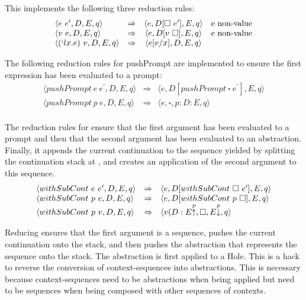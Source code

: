 This implements the following three reduction rules:
\[
\begin{array}{lrcl}
  \langle e\ e^\prime, D, E, q \rangle &\Rightarrow &\langle e, D[\square\ e^\prime], E, q \rangle &\text{e non-value} \\
  \langle v\ e, D, E, q \rangle &\Rightarrow &\langle e, D[v\ \square], E, q \rangle &\text{e non-value} \\
  \langle (`lx.e)\ v, D, E, q \rangle &\Rightarrow &\langle e[v/x], D, E, q \rangle
\end{array}
\]

The following reduction rules for pushPrompt are implemented to ensure the first expression has been evaluated to a prompt:
\[
  \begin{array}{lcl}
    \langle pushPrompt\ e\ e^\prime, D, E, q \rangle &\Rightarrow &\langle e, D[pushPrompt\ \square\ e^\prime], E, q \rangle \\
    \langle pushPrompt\ p\ e, D, E, q \rangle &\Rightarrow &\langle e, \square, p : D : E, q \rangle \\
  \end{array}
\]

The reduction rules for  ensure that the first argument has been evaluated to a prompt  and then that the second argument has been evaluated to an abstraction. Finally, it appends the current continuation to the sequence yielded by splitting the continuation stack at , and creates an application of the second argument to this sequence.
\[
  \begin{array}{lcl}
\langle withSubCont\ e\ e^\prime, D, E, q \rangle &\Rightarrow &\langle e, D[withSubCont\ \square\ e^\prime], E, q \rangle\\
\langle withSubCont\ p\ e, D, E, q \rangle &\Rightarrow &\langle e, D[withSubCont\ p\ \square], E, q \rangle \\
\langle withSubCont \ p\ v, D, E, q \rangle &\Rightarrow &\langle v (D : E\textsmaller[1]{\overset{p}{\uparrow}}, \square, E\textsmaller[1]{\overset{p}{\downarrow}}, q \rangle \\
  \end{array}
\]

Reducing  ensures that the first argument is a sequence, pushes the current continuation onto the stack, and then pushes the abstraction that represents the sequence onto the stack. The abstraction is first applied to a Hole. This is a hack to reverse the conversion of context-sequences into abstractions. This is necessary because context-sequences need to be abstractions when being applied but need to be sequences when being composed with other sequences of contexts.

